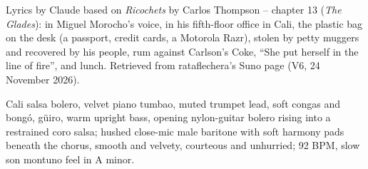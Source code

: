 
\begin{notes}
Lyrics by Claude based on \emph{Ricochets} by Carlos Thompson -- chapter 13 (\emph{The Glades}): in Miguel Morocho's voice, in his fifth-floor office in Cali, the plastic bag on the desk (a passport, credit cards, a Motorola Razr), stolen by petty muggers and recovered by his people, rum against Carlson's Coke, ``She put herself in the line of fire'', and lunch. Retrieved from rataflechera's Suno page (V6, 24 November 2026).
\end{notes}
\begin{style}
Cali salsa bolero, velvet piano tumbao, muted trumpet lead, soft congas and bongó, güiro, warm upright bass, opening nylon-guitar bolero rising into a restrained coro salsa; hushed close-mic male baritone with soft harmony pads beneath the chorus, smooth and velvety, courteous and unhurried; 92 BPM, slow son montuno feel in A minor.
\end{style}
